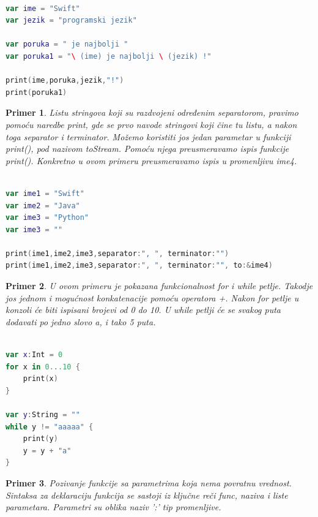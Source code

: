 \documentclass[a4paper]{article}
\newtheorem{primer}{Primer}[section]
\begin{document}
\begin{lstlisting}[language=Swift, caption={Stringovi i konkatenacija stringova},frame=single, label=simple]

var ime = "Swift"
var jezik = "programski jezik"

var poruka = " je najbolji "
var poruka1 = "\ (ime) je najbolji \ (jezik) !" 

print(ime,poruka,jezik,"!")
print(poruka1)

\end{lstlisting}

\begin{primer}
Listu stringova koji su razdvojeni određenim separatorom, pravimo pomoću naredbe print, gde se prvo navode stringovi koji čine tu listu, a nakon toga separator i terminator. Možemo koristiti jos jedan parametar u funkciji print(), pod nazivom toStream. Pomoću njega preusmeravamo ispis funkcije print(). Konkretno u ovom primeru preusmeravamo ispis u promenljivu ime4.
\end{primer}
\begin{lstlisting}[language=Swift, caption={Lista stringova},frame=single, label=simple]

var ime1 = "Swift"
var ime2 = "Java"
var ime3 = "Python"
var ime3 = ""

print(ime1,ime2,ime3,separator:", ", terminator:"")
print(ime1,ime2,ime3,separator:", ", terminator:"", to:&ime4)

\end{lstlisting}

\begin{primer}
U ovom primeru je pokazana funkcionalnost for i while petlje. Takodje jos jednom i mogućnost konkatenacije pomoću operatora +. Nakon for petlje u konzoli će biti ispisani brojevi od 0 do 10. U while petlji će se svakog puta dodavati po jedno slovo a, i tako 5 puta.
\end{primer}

\begin{lstlisting}[language=Swift, caption={Petlje},frame=single, label=simple]

var x:Int = 0
for x in 0...10 {
	print(x)
}

var y:String = ""
while y != "aaaaa" {
	print(y)
	y = y + "a"
}

\end{lstlisting}

\begin{primer}
Pozivanje funkcije sa parametrima koja nema povratnu vrednost. Sintaksa za deklaraciju funkcija se sastoji iz ključne reči func, naziva i liste parametara. Parametri su oblika naziv ':' tip promenljive.
\end{primer}
\end{document}

